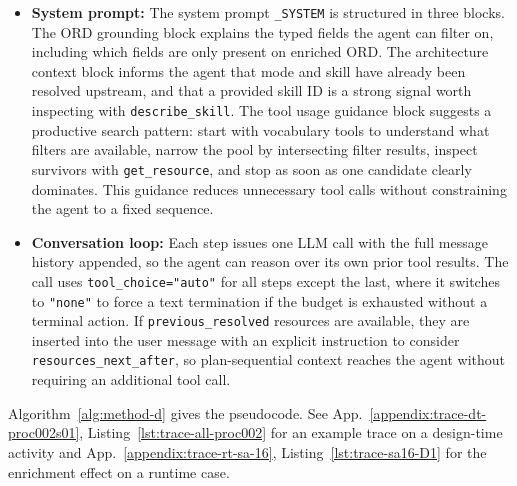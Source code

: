 \begin{itemize}
  \item \textbf{System prompt:} The system prompt \texttt{\_SYSTEM} is structured in three blocks. The ORD grounding block explains the typed fields the agent can filter on, including which fields are only present on enriched ORD. The architecture context block informs the agent that mode and skill have already been resolved upstream, and that a provided skill ID is a strong signal worth inspecting with \texttt{describe\_skill}. The tool usage guidance block suggests a productive search pattern: start with vocabulary tools to understand what filters are available, narrow the pool by intersecting filter results, inspect survivors with \texttt{get\_resource}, and stop as soon as one candidate clearly dominates. This guidance reduces unnecessary tool calls without constraining the agent to a fixed sequence.

  \item \textbf{Conversation loop:} Each step issues one LLM call with the full message history appended, so the agent can reason over its own prior tool results. The call uses \texttt{tool\_choice="auto"} for all steps except the last, where it switches to \texttt{"none"} to force a text termination if the budget is exhausted without a terminal action. If \texttt{previous\_resolved} resources are available, they are inserted into the user message with an explicit instruction to consider \texttt{resources\_next\_after}, so plan-sequential context reaches the agent without requiring an additional tool call.
\end{itemize}

Algorithm~\ref{alg:method-d} gives the pseudocode. See App.~\ref{appendix:trace-dt-proc002s01}, Listing~\ref{lst:trace-all-proc002} for an example trace on a design-time activity and App.~\ref{appendix:trace-rt-sa-16}, Listing~\ref{lst:trace-sa16-D1} for the enrichment effect on a runtime case.


